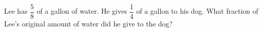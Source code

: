 Lee has $\dfrac{5}{8}$ of a gallon of water. He gives $\dfrac{1}{4}$ of a gallon to his dog. What fraction of Lee's original amount of water did he give to the dog?
